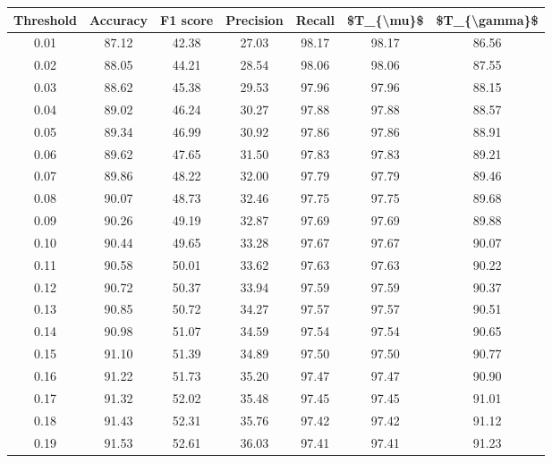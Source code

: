 \begin{tabular}{|c|c|c|c|c|c|c|}
\hline
 Threshold &  Accuracy &  F1 score &  Precision &  Recall &  \$T\_\{\textbackslash mu\}\$ &  \$T\_\{\textbackslash gamma\}\$ \\
\hline
      0.01 &     87.12 &     42.38 &      27.03 &   98.17 &      98.17 &         86.56 \\
      0.02 &     88.05 &     44.21 &      28.54 &   98.06 &      98.06 &         87.55 \\
      0.03 &     88.62 &     45.38 &      29.53 &   97.96 &      97.96 &         88.15 \\
      0.04 &     89.02 &     46.24 &      30.27 &   97.88 &      97.88 &         88.57 \\
      0.05 &     89.34 &     46.99 &      30.92 &   97.86 &      97.86 &         88.91 \\
      0.06 &     89.62 &     47.65 &      31.50 &   97.83 &      97.83 &         89.21 \\
      0.07 &     89.86 &     48.22 &      32.00 &   97.79 &      97.79 &         89.46 \\
      0.08 &     90.07 &     48.73 &      32.46 &   97.75 &      97.75 &         89.68 \\
      0.09 &     90.26 &     49.19 &      32.87 &   97.69 &      97.69 &         89.88 \\
      0.10 &     90.44 &     49.65 &      33.28 &   97.67 &      97.67 &         90.07 \\
      0.11 &     90.58 &     50.01 &      33.62 &   97.63 &      97.63 &         90.22 \\
      0.12 &     90.72 &     50.37 &      33.94 &   97.59 &      97.59 &         90.37 \\
      0.13 &     90.85 &     50.72 &      34.27 &   97.57 &      97.57 &         90.51 \\
      0.14 &     90.98 &     51.07 &      34.59 &   97.54 &      97.54 &         90.65 \\
      0.15 &     91.10 &     51.39 &      34.89 &   97.50 &      97.50 &         90.77 \\
      0.16 &     91.22 &     51.73 &      35.20 &   97.47 &      97.47 &         90.90 \\
      0.17 &     91.32 &     52.02 &      35.48 &   97.45 &      97.45 &         91.01 \\
      0.18 &     91.43 &     52.31 &      35.76 &   97.42 &      97.42 &         91.12 \\
      0.19 &     91.53 &     52.61 &      36.03 &   97.41 &      97.41 &         91.23 \\

\end{tabular}
